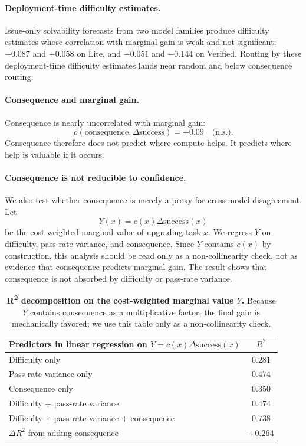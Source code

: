\documentclass{article}
\begin{document}
\paragraph{Deployment-time difficulty estimates.}
Issue-only solvability forecasts from two model families produce
difficulty estimates whose correlation with marginal gain is weak and
not significant: $-0.087$ and $+0.058$ on Lite, and $-0.051$ and
$-0.144$ on Verified. Routing by these deployment-time difficulty
estimates lands near random and below consequence routing.

\paragraph{Consequence and marginal gain.}
Consequence is nearly uncorrelated with marginal gain:
\[
\rho(\mathrm{consequence},\Delta\mathrm{success})=+0.09
\quad \text{(n.s.)}.
\]
Consequence therefore does not predict where compute helps. It predicts
where help is valuable if it occurs.

\paragraph{Consequence is not reducible to confidence.}
We also test whether consequence is merely a proxy for cross-model
disagreement. Let
\[
Y(x)=c(x)\Delta\mathrm{success}(x)
\]
be the cost-weighted marginal value of upgrading task $x$. We regress
$Y$ on difficulty, pass-rate variance, and consequence. Since $Y$
contains $c(x)$ by construction, this analysis should be read only as
a non-collinearity check, not as evidence that consequence predicts
marginal gain. The result shows that consequence is not absorbed by
difficulty or pass-rate variance.

\begin{table}[h]
\centering
\caption{\textbf{R\textsuperscript{2} decomposition on the
cost-weighted marginal value $Y$.} Because $Y$ contains consequence as
a multiplicative factor, the final gain is mechanically favored; we
use this table only as a non-collinearity check.}
\label{tab:r2decomp}
\small
\begin{tabular}{lc}
\toprule
Predictors in linear regression on $Y=c(x)\Delta\mathrm{success}(x)$ & $R^{2}$ \\
\midrule
Difficulty only                                   & $0.281$ \\
Pass-rate variance only                           & $0.474$ \\
Consequence only                                  & $0.350$ \\
Difficulty + pass-rate variance                   & $0.474$ \\
Difficulty + pass-rate variance + consequence     & $\mathbf{0.738}$ \\
\midrule
$\Delta R^{2}$ from adding consequence            & $+0.264$ \\
\bottomrule
\end{tabular}
\end{table}
\end{document}
